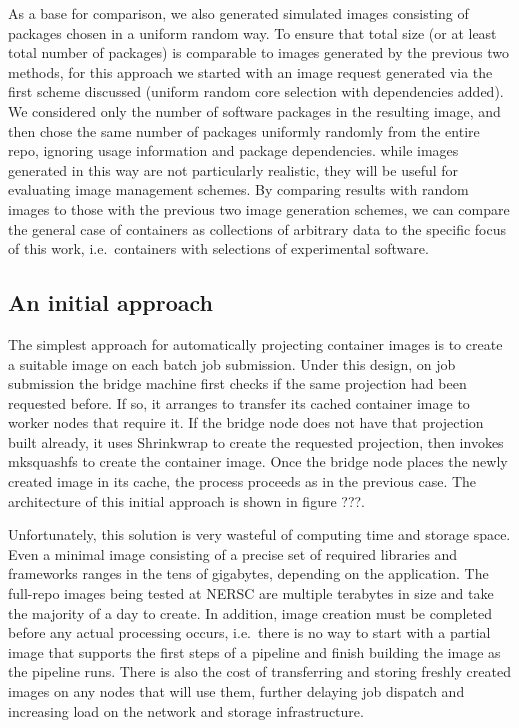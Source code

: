 \documentclass[sigconf]{acmart}
\begin{document}
As a base for comparison,
we also generated simulated images consisting of packages chosen in a uniform random way.
To ensure that total size (or at least total number of packages)
is comparable to images generated by the previous two methods,
for this approach we started with an image request generated via the first scheme discussed
(uniform random core selection with dependencies added).
We considered only the number of software packages in the resulting image,
and then chose the same number of packages uniformly randomly from the entire repo,
ignoring usage information and package dependencies.
while images generated in this way are not particularly realistic,
they will be useful for evaluating image management schemes.
By comparing results with random images to those with the previous two image generation schemes,
we can compare the general case of containers as collections of arbitrary data to the specific focus of this work,
i.e.\ containers with selections of experimental software.

\subsection{An initial approach}

The simplest approach for automatically projecting container images is to create a suitable image on each batch job submission.
Under this design,
on job submission the bridge machine first checks if the same projection had been requested before.
If so, it arranges to transfer its cached container image to worker nodes that require it.
If the bridge node does not have that projection built already,
it uses Shrinkwrap to create the requested projection,
then invokes mksquashfs to create the container image.
Once the bridge node places the newly created image in its cache,
the process proceeds as in the previous case.
The architecture of this initial approach is shown in figure ???.

Unfortunately, this solution is very wasteful of computing time and storage space.
Even a minimal image consisting of a precise set of required libraries and frameworks ranges in the tens of gigabytes,
depending on the application.
The full-repo images being tested at NERSC are multiple terabytes in size and take the majority of a day to create.
In addition, image creation must be completed before any actual processing occurs,
i.e.\ there is no way to start with a partial image that supports the first steps of a pipeline and finish building the image as the pipeline runs.
There is also the cost of transferring and storing freshly created images on any nodes that will use them,
further delaying job dispatch and increasing load on the network and storage infrastructure.
\end{document}
